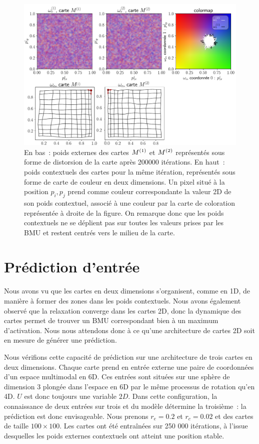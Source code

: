 \documentclass[../main]{subfiles}
\begin{document}
\begin{figure}
	\centering\includegraphics[width=\textwidth]{w_cub_rc002.pdf}
	\caption{En bas~: poids externes des cartes $M^{({1})}$ et $M^{({2})}$ représentés sous forme de distorsion de la carte après 200000 itérations.
	En haut~: poids contextuels des cartes pour la même itération, représentés sous forme de carte de couleur en deux dimensions. Un pixel situé à la position $p_i,p_j$ prend comme couleur correspondante la valeur 2D de son poids contextuel, associé à une couleur par la carte de coloration représentée à droite de la figure.
	On remarque donc que les poids contextuels ne se déplient pas sur toutes les valeurs prises par les BMU et restent centrés vers le milieu de la carte. \label{fig:2som_cub_wc}}
\end{figure}

\section{Prédiction d'entrée \label{par:pred2D}}

Nous avons vu que les cartes en deux dimensions s'organisent, comme en 1D, de manière à former des zones dans les poids contextuels.  Nous avons également observé que la relaxation converge dans les cartes 2D, donc la dynamique des cartes permet de trouver un BMU correspondant bien à un maximum d'activation.
Nous nous attendons donc à ce qu'une architecture de cartes 2D soit en mesure de générer une prédiction.

Nous vérifions cette capacité de prédiction sur une architecture de trois cartes en deux dimensions. 
Chaque carte prend en entrée externe une paire de coordonnées d'un espace multimodal en 6D. Ces entrées sont situées sur une sphère de dimension 3 plongée dans l'espace en 6D par le même processus de rotation qu'en 4D. $U$ est donc toujours une variable $2D$. 
Dans cette configuration, la connaissance de deux entrées sur trois et du modèle détermine la troisième~: la prédiction est donc envisageable.
Nous prenons $r_e = 0.2$ et $r_c = 0.02$ et des cartes de taille $100 \times 100$. Les cartes ont été entraînées sur 250 000 itérations, à l'issue desquelles les poids externes contextuels ont atteint une position stable.
\end{document}
